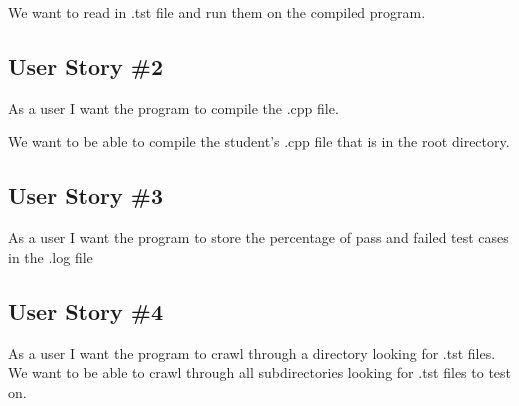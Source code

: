 We want to read in .tst file and run them on the compiled program.


\subsection{User Story \#2} 
As a user I want the program to compile the .cpp file.

We want to be able to compile the student's .cpp file that is in the root directory.



\subsection{User Story \#3} 
As a user I want the program to store the percentage of pass and failed test cases in the .log file

\subsection{User Story \#4}
As a user I want the program to crawl through a directory looking for .tst files.
 We want to be able to crawl through all subdirectories looking for .tst files to test on.









